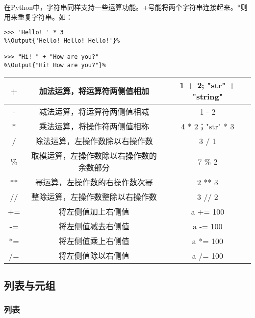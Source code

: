 在Python中，字符串同样支持一些运算功能。+号能将两个字符串连接起来。*则用来重复字符串。如：

\begin{lstlisting}
>>> 'Hello! ' * 3
%\Output{'Hello! Hello! Hello!'}%

>>> "Hi! " + "How are you?"
%\Output{"Hi! How are you?"}%

\end{lstlisting}

\begin{center}
    \tabletail{\hline}
    \tablelasttail{\hline}
    \begin{supertabular}{|c|c|c|}
        \hline
        + & 加法运算，将运算符两侧值相加 & 1 + 2; "str" + "string" \\
        \hline
        - & 减法运算，将运算符两侧值相减 & 1 - 2\\
        \hline
        * & 乘法运算，将操作符两侧值相称 & 4 * 2；"str" * 3\\
        \hline
        / & 除法运算，左操作数除以右操作数 & 3 / 1\\
        \hline
        \% & 取模运算，左操作数除以右操作数的余数部分 & 7 \% 2\\
        \hline
        ** & 幂运算，左操作数的右操作数次幂 & 2 ** 3\\
        \hline
        // & 整除运算，左操作数整除以右操作数& 3 // 2\\
        \hline
        += & 将左侧值加上右侧值 & a += 100\\
        \hline
        -= & 将左侧值减去右侧值 & a -= 100\\
        \hline
        *= & 将左侧值乘上右侧值 & a *= 100\\
        \hline
        /= & 将左侧值除以右侧值 & a /= 100\\
        \hline
    \end{supertabular}
    \label{table:4.1.2}
\end{center}


\subsection{列表与元组}

\subsubsection{列表}


